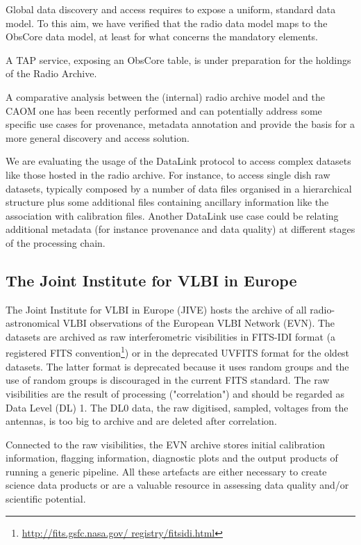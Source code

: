 \documentclass[11pt,a4paper]{ivoatex/ivoa}
\begin{document}
Global data discovery and access requires to expose a uniform, standard data model. To this aim, we have 
verified that the radio data model maps to the ObsCore data model, at least  for what concerns the 
mandatory elements.

A TAP service, exposing an ObsCore table, is under preparation for the holdings of the Radio Archive.

A comparative analysis between the (internal) radio archive model and the CAOM one has been recently 
performed and can potentially address some specific use cases for provenance, metadata annotation and 
provide the basis for a more general discovery and access solution.

We are evaluating the usage of the DataLink protocol to access complex datasets like those hosted in the 
radio archive. For instance, to access single dish raw datasets, typically composed by a number of data 
files organised in a hierarchical structure plus some additional files containing ancillary information 
like the association with calibration files. Another DataLink use case could be relating additional 
metadata (for instance provenance and data quality) at different stages of the processing chain.

\subsection{The Joint Institute for VLBI in Europe}
\label{sec:JIVE}
The Joint Institute for VLBI in Europe (JIVE) hosts the archive of all radio-astronomical VLBI 
observations of the European VLBI Network (EVN). The datasets are archived as raw interferometric 
visibilities in FITS-IDI format (a registered FITS convention\footnote{\url{ http://fits.gsfc.nasa.gov/
registry/fitsidi.html}}) or in the deprecated UVFITS format for the oldest datasets. The latter format 
is deprecated because it uses random groups and the use of random groups is discouraged in the current
FITS standard. The raw visibilities are the result of processing ("correlation") and should be regarded
as Data Level (DL) 1. The DL0 data, the raw digitised, sampled, voltages from the antennas, is too big to
archive and are deleted after correlation.

Connected to the raw visibilities, the EVN archive stores initial calibration information, flagging 
information, diagnostic plots and the output products of running a generic pipeline. All these artefacts 
are either necessary to create science data products or are a valuable resource in assessing data 
quality and/or scientific potential.
\end{document}
